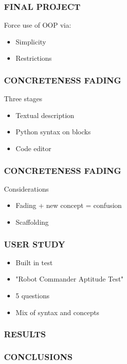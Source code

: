 \documentclass{beamer}
\let\theframetitle\frametitle
\renewcommand\frametitle[1]{\theframetitle{\MakeUppercase{#1}}}
\begin{document}
\begin{frame}
\frametitle{Final Project}
Force use of OOP via:
\begin{itemize}[<+->]
\item Simplicity
\item Restrictions
\end{itemize}
\end{frame}

\begin{frame}
\frametitle{Concreteness Fading}
Three stages
\begin{itemize}[<+->]
\item Textual description
\item Python syntax on blocks
\item Code editor
\end{itemize}
\end{frame}

\begin{frame}
\frametitle{Concreteness Fading}
Considerations
\begin{itemize}[<+->]
\item Fading + new concept = confusion
\item Scaffolding
\end{itemize}
\end{frame}

\begin{frame}
\frametitle{User Study}
\begin{itemize}[<+->]
\item Built in test
\item "Robot Commander Aptitude Test"
\item 5 questions
\item Mix of syntax and concepts
\end{itemize}
\end{frame}

\begin{frame}
\frametitle{Results}
\end{frame}

\begin{frame}
\frametitle{Conclusions}
\end{frame}
\end{document}
